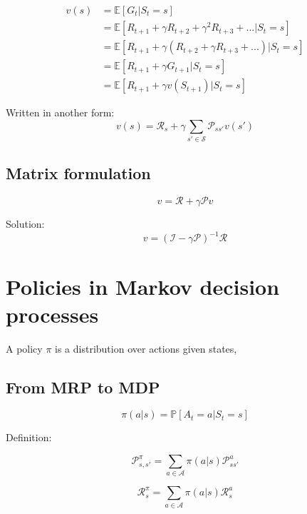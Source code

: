 \documentclass{article}
\begin{document}
\begin{equation}
\begin{aligned}
    v(s) &= \mathbb{E}[G_t | S_t = s]\\
         &= \mathbb{E}[R_{t+1} + \gamma R_{t+2} + \gamma^2 R_{t+3} + ... | S_t = s]\\
         &= \mathbb{E}[R_{t+1} + \gamma (R_{t+2} + \gamma R_{t+3} + ...) | S_t = s]\\
         &= \mathbb{E}[R_{t+1} + \gamma G_{t+1} | S_t = s]\\
         &= \mathbb{E}[R_{t+1} + \gamma v(S_{t+1}) | S_t = s]
\end{aligned}
\end{equation}

Written in another form:
\begin{equation}
    v(s) = \mathcal{R}_s + \gamma \sum_{s'\in\mathcal{S}} \mathcal{P}_{ss'}v(s')
\end{equation}

\subsection{Matrix formulation}
\begin{equation}
    v = \mathcal{R} + \gamma \mathcal{P} v
\end{equation}

Solution:
\begin{equation}
    v = (\mathcal{I} - \gamma \mathcal{P})^{-1} \mathcal{R}
\end{equation}

\section{Policies in Markov decision processes}
A policy $\pi$ is a distribution over actions given states,
\subsection{From MRP to MDP}
\begin{equation}
    \pi(a|s) = \mathbb{P}[A_t = a | S_t = s]
\end{equation}

Definition:

\begin{equation}
\mathcal{P}^{\pi}_{s, s'} = \sum_{a\in\mathcal{A}} \pi(a|s) \mathcal{P}^a_{ss'}
\end{equation}

\begin{equation}
\mathcal{R}^{\pi}_{s} = \sum_{a\in\mathcal{A}}\pi(a|s) \mathcal{R}^a_s
\end{equation}
\end{document}
